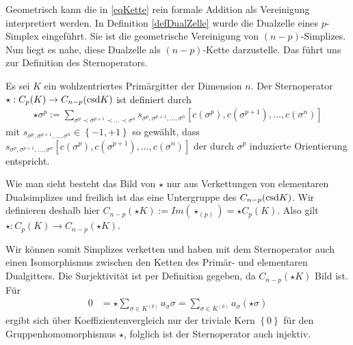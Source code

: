   Geometrisch kann die in \eqref{eqKette} rein formale Addition als Vereinigung interpretiert werden. 
  In Definition \ref{defDualZelle} wurde die Dualzelle eines \( p \)-Simplex eingeführt. 
  Sie ist die geometrische Vereinigung von \( (n-p) \)-Simplizes.
  Nun liegt es nahe, diese Dualzelle als \( (n-p) \)-Kette darzustelle.
  Das führt uns zur Definition des Sternoperators.

  \begin{definition}
     Es sei \( K \) ein wohlzentriertes Primärgitter der Dimension \( n \).
     Der Sternoperator \( \star: C_{p}(K) \rightarrow   C_{n-p}(\text{csd} K) \) ist definiert durch
     \begin{align}
       \star\sigma^{p} := \sum_{\sigma^{p} \prec \sigma^{p+1} \prec \ldots \prec \sigma^{n}}
                                                   s_{\sigma^{p}, \sigma^{p+1}, \ldots, \sigma^{n}} \left[ c(\sigma^{p}), c(\sigma^{p+1}), \ldots, c(\sigma^{n}) \right]
     \end{align}
     mit \( s_{\sigma^{p}, \sigma^{p+1}, \ldots, \sigma^{n}} \in \left\{ -1,+1 \right\}\) so gewählt, dass  
     \( s_{\sigma^{p}, \sigma^{p+1}, \ldots, \sigma^{n}} \left[ c(\sigma^{p}), c(\sigma^{p+1}), \ldots, c(\sigma^{n}) \right] \) der
     durch \( \sigma^{p} \) induzierte Orientierung entspricht.
  \end{definition}
  Wie man sieht besteht das Bild von \( \star \) nur aus Verkettungen von elementaren Dualsimplizes und freilich ist das eine Untergruppe des \( C_{n-p}(\text{csd} K) \).
  Wir definieren deshalb hier \( C_{n-p}(\star K) := Im(\star_{(p)}) = \star C_{p}(K) \).
  Also gilt \( \star: C_{p}(K) \rightarrow   C_{n-p}(\star K) \).

  Wir können somit Simplizes verketten und haben mit dem Sternoperator auch einen Isomorphismus
  zwischen den Ketten des Primär- und elementaren Dualgitters.
  Die Surjektivität ist per Definition gegeben, da \( C_{n-p}(\star K) \) Bild ist.
  Für
  \begin{align}
    0 &= \star \sum_{\sigma \in K^{(p)}} a_{\sigma}\sigma = \sum_{\sigma \in K^{(p)}} a_{\sigma} \left( \star\sigma\right)
  \end{align}
  ergibt sich über Koeffizientenvergleich nur der triviale Kern \( \left\{ 0 \right\} \) für den Gruppenhomomorphismus \( \star \), 
  folglich ist der Sternoperator auch injektiv.
  
